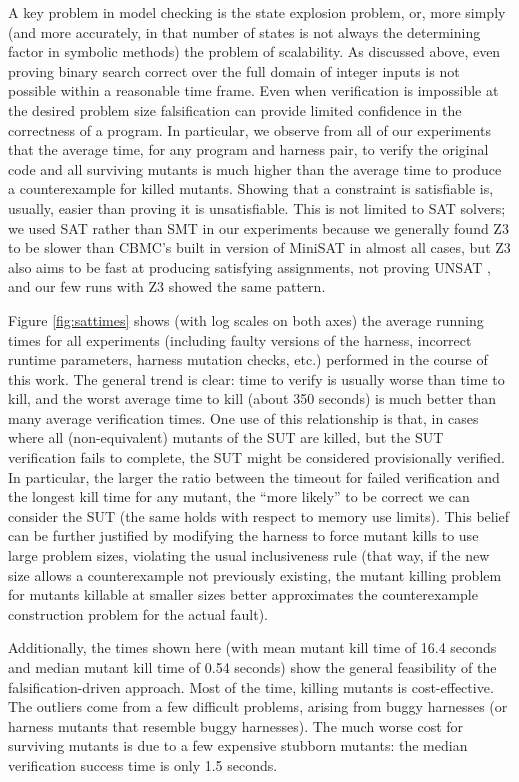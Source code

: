 \documentclass{svjour3}
\begin{document}
A key problem in model checking is the state explosion problem, or,
more simply (and more accurately, in that number of states is not
always the determining factor in symbolic methods) the problem of
scalability.  As discussed above, even proving binary search correct
over the full domain of integer inputs is not possible within a
reasonable time frame.  Even when verification is impossible at the
desired problem size falsification can provide limited
confidence in the correctness of a program.  In particular, we observe
from all of our experiments that the average time, for any program and
harness pair, to verify the original code and all surviving mutants is
much higher than the average time to produce a counterexample
for killed mutants.  Showing that a constraint is satisfiable is,
usually, easier than proving it is unsatisfiable.  This is not limited
to SAT solvers; we used SAT rather than SMT in our experiments because
we generally found Z3 to be slower than CBMC's built in version of
MiniSAT\cite{minisat} in almost all cases, but Z3 also
aims to be fast at producing satisfying assignments, not proving UNSAT
\cite{z3}, and our few runs with Z3 showed the same pattern.

Figure \ref{fig:sattimes} shows (with log scales on both axes) the
average running times for all experiments (including faulty versions
of the harness, incorrect runtime parameters, harness mutation checks,
etc.) performed in the course of this work.  The general trend is
clear: time to verify is usually worse than time to kill, and the
worst average time to kill (about 350 seconds) is much better than
many average verification times.  One use of this relationship is
that, in cases where all (non-equivalent) mutants of the SUT are
killed, but the SUT verification fails to complete, the SUT might be
considered provisionally verified. In particular, the larger
the ratio between the timeout for failed verification and the longest
kill time for any mutant, the ``more likely'' to be correct we can
consider the SUT (the same holds with respect to memory use
limits). This belief can be further justified by modifying the harness
to force mutant kills to use large problem sizes, violating the usual
inclusiveness rule (that way, if the new size allows a counterexample
not previously existing, the mutant killing problem for mutants
killable at smaller sizes better approximates the counterexample
construction problem for the actual fault).

Additionally, the times shown here (with mean mutant kill time of 16.4
seconds and median mutant kill time of 0.54 seconds) show the general
feasibility of the falsification-driven approach.  Most of the time,
killing mutants is cost-effective.  The outliers come from a few
difficult problems, arising from buggy harnesses (or harness mutants
that resemble buggy harnesses).  The much worse cost for surviving
mutants is due to a few expensive stubborn mutants: the median
verification success time is only 1.5 seconds.
\end{document}
